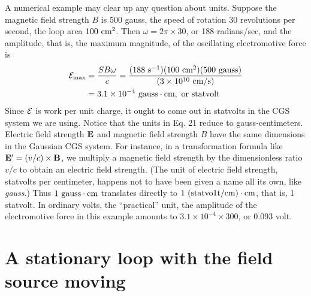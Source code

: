 A numerical example may clear up any question about units.
Suppose the magnetic field strength $B$ is 500 gauss, the speed of rotation
30 revolutions per second, the loop area $100\ \textup{cm}^2$. Then
$\omega = 2\pi \times 30$, or 188 radians/sec, and the amplitude, that is, the
maximum magnitude, of the oscillating electromotive force is
\begin{align}
\begin{split}
  \emf_{\text{max}} &= \frac{SB\omega}{c} 
        = \frac{(188\ \sunit^{-1})(100\ \cmunit^2)(500\ \text{gauss})}{(3\times10^{10}\ \cmunit/\sunit)} \\
        &= 3.1\times10^{-4}\ \text{gauss}\cdot\cmunit,\ \text{or statvolt}
\end{split}
\end{align}
Since $\mathcal{E}$ is work per unit charge, it ought to come out in statvolts in
the CGS system we are using. Notice that the units in Eq. 21 reduce
to gauss-centimeters. Electric field strength $\mathbf{E}$ and magnetic field
strength $B$ have the same dimensions in the Gaussian CGS system.
For instance, in a transformation formula like $\mathbf{E}' = (v/c) \times \mathbf{B}$, we
multiply a magnetic field strength by the dimensionless ratio $v/c$ to
obtain an electric field strength. (The unit of electric field strength,
statvolts per centimeter, happens not to have been given a name all
its own, like \emph{gauss}.) Thus $1\ \textup{gauss}\cdot\textup{cm}$ translates directly to 
$1\ (\text{statvo1t}/\cmunit)\cdot\cmunit$, that is, 1 statvolt. In ordinary volts, the ``practical''
unit, the amplitude of the electromotive force in this example
amounts to $3.1 \times 10^{-4} \times 300$, or 0.093 volt.

\section{A stationary loop with the field source moving}

